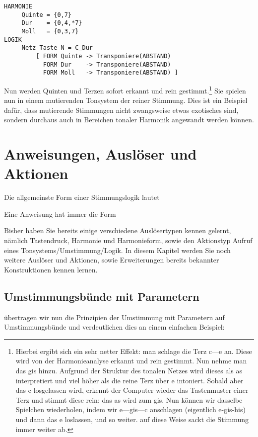 \begin{verbatim}
HARMONIE
	 Quinte = {0,7}
	 Dur    = {0,4,*7}
	 Moll   = {0,3,7}
LOGIK 
	 Netz Taste N = C_Dur
	     [ FORM Quinte -> Transponiere(ABSTAND)
	       FORM Dur    -> Transponiere(ABSTAND)
	       FORM Moll   -> Transponiere(ABSTAND) ]
\end{verbatim}

Nun werden Quinten und Terzen sofort erkannt und rein 
gestimmt.\footnote{Hierbei ergibt sich ein sehr netter Effekt: man schlage 
die Terz c---e an. Diese wird von der Harmonieanalyse erkannt und rein 
gestimmt. Nun nehme man das gis hinzu. Aufgrund der Struktur des tonalen 
Netzes wird dieses als as interpretiert und viel höher als die reine Terz 
über e intoniert. Sobald aber das c losgelassen wird, erkennt der Computer 
wieder das Tastenmuster einer Terz und stimmt diese rein: das as wird zum 
gis. Nun können wir dasselbe Spielchen wiederholen, indem wir e---gis---c 
anschlagen (eigentlich e-gis-his) und dann das e loslassen, und so weiter. 
auf diese Weise sackt die Stimmung immer weiter ab.} Sie spielen nun in 
einem mutierenden Tonsystem der reiner Stimmung. Dies ist ein Beispiel 
dafür, dass mutierende Stimmungen nicht zwangsweise etwas exotisches sind, 
sondern durchaus auch in Bereichen tonaler Harmonik angewandt werden 
können.


\chapter{Anweisungen, Auslöser und Aktionen}\label{cha:anwe-ausl-und}
Die allgemeinste Form einer Stimmungslogik lautet


Eine Anweisung hat immer die Form


Bisher haben Sie bereits einige verschiedene Auslösertypen kennen gelernt, 
nämlich Tastendruck, Harmonie und Harmonieform, 
sowie den Aktionstyp Aufruf eines 
Tonsystems/Umstimmung/Logik. In diesem Kapitel werden Sie noch weitere 
Auslöser und Aktionen, sowie Erweiterungen bereits bekannter 
Konstruktionen kennen lernen.

\section{Umstimmungsbünde mit Parametern}\label{sec:umst-mit-param}
übertragen wir nun die Prinzipien der Umstimmung mit Parametern auf 
Umstimmungsbünde und verdeutlichen dies an einem einfachen Beispiel:

